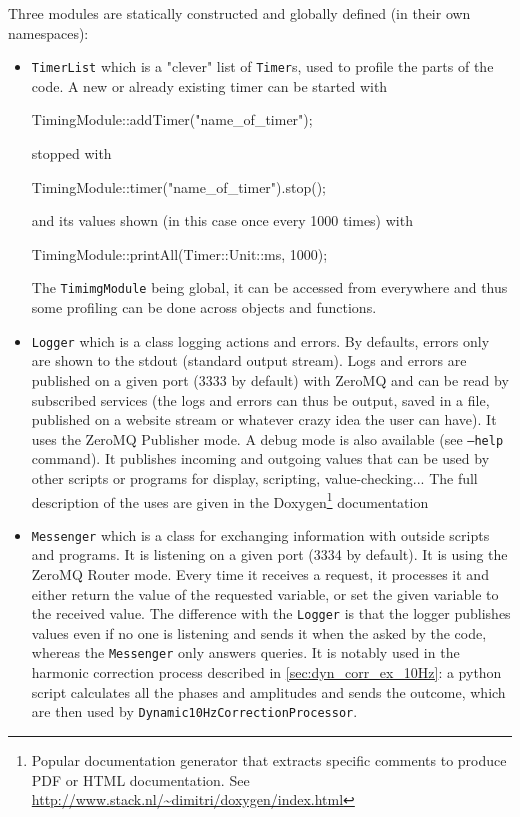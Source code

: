 Three modules are statically constructed and globally defined (in their own namespaces):
\begin{itemize}
    \item \texttt{TimerList} which is a "clever" list of \texttt{Timer}s, used to profile the parts of the code. A new or already existing timer can be started with
     \begin{c++}
         TimingModule::addTimer("name_of_timer");           
     \end{c++}
    stopped with 
    \begin{c++}
        TimingModule::timer("name_of_timer").stop();   
    \end{c++}
    and its values shown (in this case once every 1000 times) with
    \begin{c++}
        TimingModule::printAll(Timer::Unit::ms, 1000);
    \end{c++}
    The \texttt{TimimgModule} being global, it can be accessed from everywhere and thus some profiling can be done across objects and functions.

    \item \texttt{Logger} which is a class logging actions and errors. By defaults, errors only are shown to the stdout (standard output stream). Logs and errors are published on a given port (3333 by default) with ZeroMQ and can be read by subscribed services (the logs and errors can thus be output, saved in a file, published on a website stream or whatever crazy idea the user can have). It uses the ZeroMQ Publisher mode. A debug mode is also available (see \texttt{--help} command). It publishes incoming and outgoing values that can be used by other scripts or programs for display, scripting, value-checking... The full description of the uses are given in the Doxygen\footnote{Popular documentation generator that extracts specific comments to produce PDF or HTML documentation. See \url{http://www.stack.nl/~dimitri/doxygen/index.html}} documentation
    
    \item \texttt{Messenger} which is a class for exchanging information with outside scripts and programs. It is listening on a given port (3334 by default). It is using the ZeroMQ Router mode. Every time it receives a request, it processes it and either return the value of the requested variable, or set the given variable to the received value. The difference with the \texttt{Logger} is that the logger publishes values even if no one is listening and sends it when the asked by the code, whereas the \texttt{Messenger} only answers queries. It is notably used in the harmonic correction process described in \cref{sec:dyn_corr_ex_10Hz}: a python script calculates all the phases and amplitudes and sends the outcome, which are then used by \texttt{Dynamic10HzCorrectionProcessor}.
\end{itemize}

